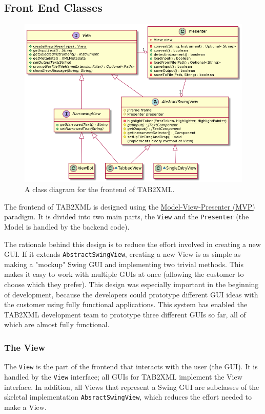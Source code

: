 \documentclass[11pt]{article}
\begin{document}
\subsection{Front End Classes}
\label{sec:org14914fd}
\begin{figure}[htbp]
\centering
\includegraphics[width=.9\linewidth]{./Diagrams/frontend-class-diagram.png}
\caption{A class diagram for the frontend of TAB2XML.}
\end{figure}

The frontend of TAB2XML is designed using the \href{https://en.wikipedia.org/wiki/Model\%E2\%80\%93view\%E2\%80\%93presenter}{Model-View-Presenter (MVP)} paradigm.  It is divided into two main parts, the \texttt{View} and the \texttt{Presenter} (the Model is handled by the backend code).

The rationale behind this design is to reduce the effort involved in creating a new GUI.  If it extends \texttt{AbstractSwingView}, creating a new View is as simple as making a "mockup" Swing GUI and implementing two trivial methods.  This makes it easy to work with multiple GUIs at once (allowing the customer to choose which they prefer).  This design was especially important in the beginning of development, because the developers could prototype different GUI ideas with the customer using fully functional applications.  This system has enabled the TAB2XML development team to prototype three different GUIs so far, all of which are almost fully functional.
\subsubsection{The View}
\label{sec:org5dec978}
The \texttt{View} is the part of the frontend that interacts with the user (the GUI).  It is handled by the \texttt{View} interface; all GUIs for TAB2XML implement the View interface.  In addition, all Views that represent a Swing GUI are subclasses of the skeletal implementation \texttt{AbsractSwingView}, which reduces the effort needed to make a View.
\end{document}
